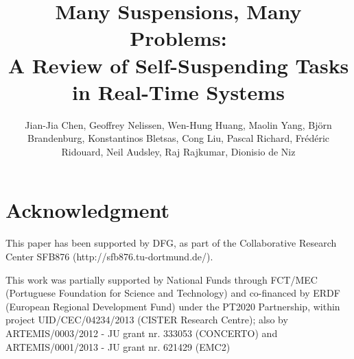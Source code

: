 



\papertrue 



\title{Many Suspensions, Many Problems:\\
A Review of Self-Suspending Tasks in Real-Time Systems}
\author{Jian-Jia Chen, Geoffrey Nelissen, Wen-Hung
  Huang, Maolin Yang, Bj\"orn Brandenburg,
  Konstantinos Bletsas, Cong Liu, Pascal
  Richard, Fr\'ed\'eric Ridouard, Neil Audsley,  Raj Rajkumar, Dionisio de Niz}

\maketitle  
 
 









\section*{Acknowledgment}

This paper has been supported by DFG, as part of the Collaborative
Research Center SFB876 (http://sfb876.tu-dortmund.de/).

This work was partially supported by National Funds through FCT/MEC (Portuguese Foundation for Science and Technology) and co-financed by ERDF (European Regional Development Fund) under the PT2020 Partnership, within project UID/CEC/04234/2013 (CISTER Research Centre); also by ARTEMIS/0003/2012 - JU grant nr. 333053 (CONCERTO) and ARTEMIS/0001/2013 - JU grant nr. 621429 (EMC2)

